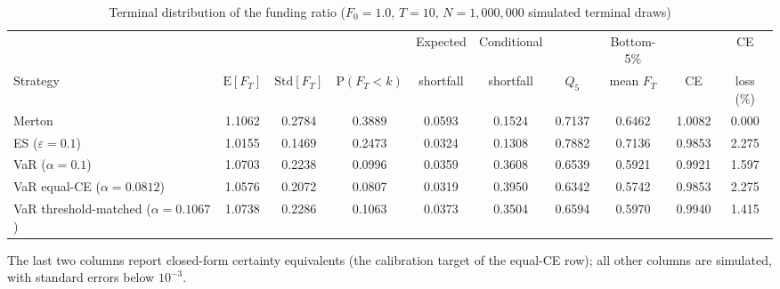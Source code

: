 \begin{table}[htbp]
\centering
\caption{Terminal distribution of the funding ratio ($F_0 = 1.0$, $T = 10$,
$N = 1{,}000{,}000$ simulated terminal draws)}
\label{tab:mc_summary}
\begin{tabular}{l ccccccccc}
\toprule
 & & & & Expected & Conditional & & Bottom-5\% & & CE \\
Strategy & $\mathrm{E}[F_T]$ & $\mathrm{Std}[F_T]$ & $\mathrm{P}(F_T<k)$
 & shortfall & shortfall & $Q_{5}$ & mean $F_T$ & CE & loss (\%) \\
\midrule
  Merton & 1.1062 & 0.2784 & 0.3889 & 0.0593 & 0.1524 & 0.7137 & 0.6462 & 1.0082 & 0.000 \\
  ES ($\varepsilon=0.1$) & 1.0155 & 0.1469 & 0.2473 & 0.0324 & 0.1308 & 0.7882 & 0.7136 & 0.9853 & 2.275 \\
  VaR ($\alpha=0.1$) & 1.0703 & 0.2238 & 0.0996 & 0.0359 & 0.3608 & 0.6539 & 0.5921 & 0.9921 & 1.597 \\
  VaR equal-CE ($\alpha=0.0812$) & 1.0576 & 0.2072 & 0.0807 & 0.0319 & 0.3950 & 0.6342 & 0.5742 & 0.9853 & 2.275 \\
  VaR threshold-matched ($\alpha=0.1067$) & 1.0738 & 0.2286 & 0.1063 & 0.0373 & 0.3504 & 0.6594 & 0.5970 & 0.9940 & 1.415 \\
\bottomrule
\end{tabular}

\vspace{2pt}
{\footnotesize The last two columns report closed-form certainty equivalents
(the calibration target of the equal-CE row); all other columns are simulated,
with standard errors below $10^{-3}$.}
\end{table}
